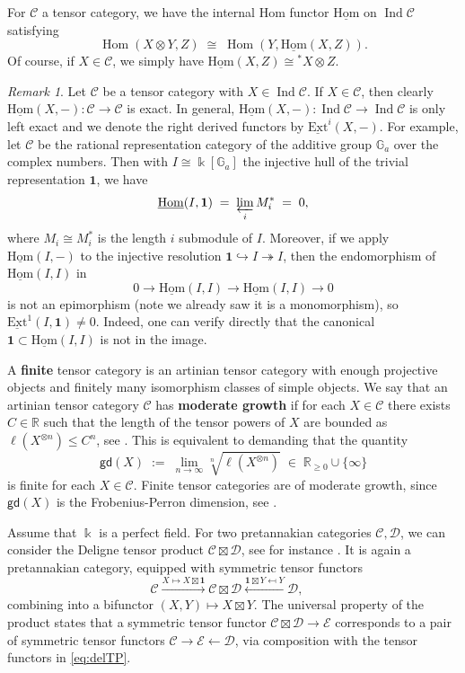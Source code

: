\documentclass[11pt]{amsart}
\def\Ind{\operatorname{Ind}}
\def\Hom{\operatorname{Hom}}
\newcommand{\uHom}{\underline{\mathrm{Hom}}}
\def\Ds{\mathscr{D}}
\def\cC{\mathscr{C}}
\def\bk{\Bbbk}
\def\mR{\mathbb{R}}
\def\gd{\mathsf{gd}}
\def\Ext{\mathrm{Ext}}
\theoremstyle{definition}
\theoremstyle{remark}
\newtheorem{remark}[thm]{Remark}
\numberwithin{equation}{section}
\newcommand{\unit}{\mathbf{1}}
\newcommand{\uExt}{\underline{\Ext}}
\newcommand{\mG}{\mathbb{G}}
\begin{document}
For $\cC$ a tensor category, we have the internal Hom functor $\uHom$ on $\Ind\cC$ satisfying
\[
\Hom(X\otimes Y,Z)\;\cong\;\Hom(Y,\uHom(X,Z)).
\]
Of course, if $X\in \cC$, we simply have $\uHom(X,Z)\cong  {^*}X\otimes Z$. 



\begin{remark}\label{rem:uExt} Let $\cC$ be a tensor category with $X\in\Ind\cC$. If $X\in\cC$, then clearly $\uHom(X,-):\cC\to\cC$ is exact. In general, $\uHom(X,-):\Ind\cC\to\Ind\cC$ is only left exact and we denote the right derived functors by $\uExt^i(X,-)$. For example, let $\cC$ be the rational representation category of the additive group $\mG_a$ over the complex numbers. Then with $I\cong \bk[\mG_a]$ the injective hull of the trivial representation $\unit$, we have $$\uHom(I,\unit)\;=\;\varprojlim_i M_i^\ast\;=\;0,$$
    where $M_i\cong M_i^\ast$ is the length $i$ submodule of $I$. Moreover, if we apply $\uHom(I,-)$ to the injective resolution $\unit\hookrightarrow I\twoheadrightarrow I$, then the endomorphism of $\uHom(I,I)$ in
    \[0\to\uHom(I,I)\to \uHom(I,I)\to 0\]
is not an epimorphism (note we already saw it is a monomorphism), so $\uExt^1(I,\unit)\not=0$. Indeed, one can verify directly that the canonical $\unit\subset\uHom(I,I)$ is not in the image.    
\end{remark}


A {\bf finite} tensor category is an artinian tensor category with enough projective objects and finitely many isomorphism classes of simple objects. We say that an artinian tensor category $\cC$ has {\bf moderate growth} if for each $X\in\cC$ there exists $C\in\mR$ such that the length of the tensor powers of $X$ are bounded as $\ell(X^{\otimes n})\le C^n$, see \cite{CEO-A}. This is equivalent to demanding that the quantity
\begin{equation}\label{def:gd}\gd(X)\;:=\; \lim_{n\to\infty}\sqrt[n]{\ell(X^{\otimes n})}\;\in\;\mR_{\ge 0}\cup\{\infty\}\end{equation}
is finite for each $X\in\cC$. Finite tensor categories are of moderate growth, since $\gd(X)$ is the Frobenius-Perron dimension, see \cite[Chapter 4]{EGNO}.

Assume that $\bk$ is a perfect field. For two pretannakian categories $\cC,\Ds$, we can consider the
Deligne tensor product $\cC\boxtimes\Ds$, see for instance \cite{Del90, CEOP}. It is again a pretannakian category, equipped with symmetric tensor functors 
\begin{equation}\label{eq:delTP}\cC\xrightarrow{X\mapsto X\boxtimes \unit}\cC\boxtimes\Ds\xleftarrow{\unit\boxtimes Y \mapsfrom Y} \Ds,\quad \end{equation}
combining into a bifunctor $(X,Y)\mapsto X\boxtimes Y$. The universal property of the product states that a symmetric tensor functor $\cC\boxtimes \Ds\to\mathscr{E}$ corresponds to a pair of symmetric tensor functors $\cC\to\mathscr{E}\leftarrow\Ds$, via composition with the tensor functors in \eqref{eq:delTP}.
\end{document}
